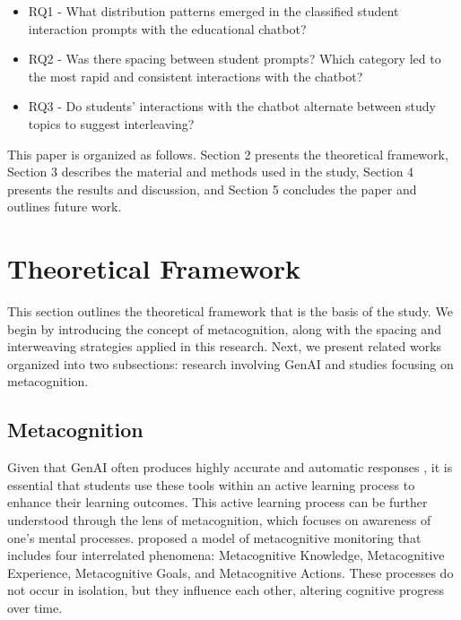 \documentclass[sn-apa]{sn-jnl} %
\begin{document}
\begin{itemize}
    \item RQ1 - What distribution patterns emerged in the classified student
    interaction prompts with the educational chatbot?
    \item RQ2 - Was there spacing between student prompts? Which category led to
    the most rapid and consistent interactions with the chatbot?
    \item RQ3 - Do students' interactions with the chatbot alternate between study
    topics to suggest interleaving?
  \end{itemize}

This paper is organized as follows. Section 2 presents the theoretical
framework, Section 3 describes the material and methods used in the study,
Section 4 presents the results and discussion, and Section 5 concludes the
paper and outlines future work.

\section{Theoretical Framework}\label{sec1}

This section outlines the theoretical framework that is the basis of the study.
We begin by introducing the concept of metacognition, along with the spacing and
interweaving strategies applied in this research. Next, we present related works
organized into two subsections: research involving GenAI and studies focusing
on metacognition.

\subsection{Metacognition}

Given that GenAI often produces highly accurate and automatic responses
\citep{Puryear22}, it is essential that students use these tools within an
active learning process to enhance their learning outcomes. This active
learning process can be further understood through the lens of metacognition,
which focuses on awareness of one's mental processes. \cite{flavell79}
proposed a model of metacognitive monitoring that includes four interrelated
phenomena: Metacognitive Knowledge, Metacognitive Experience, Metacognitive
Goals, and Metacognitive Actions. These processes do not occur in isolation, but
they influence each other, altering cognitive progress over time.
\end{document}
